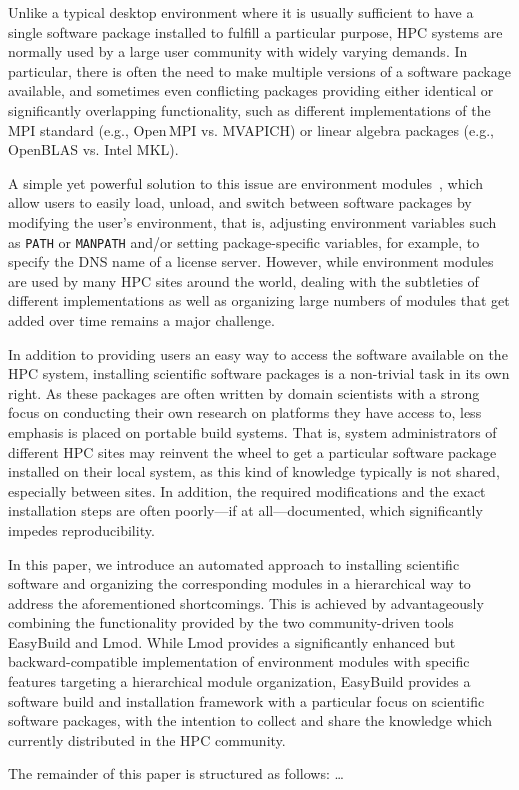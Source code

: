 Unlike a typical desktop environment where it is usually sufficient to have a
single software package installed to fulfill a particular purpose, HPC
systems are normally used by a large user community with widely varying
demands. In particular, there is often the need to make multiple versions of
a software package available, and sometimes even conflicting packages
providing either identical or significantly overlapping functionality, such
as different implementations of the MPI standard (e.g., Open\,MPI vs.
MVAPICH) or linear algebra packages (e.g., OpenBLAS vs. Intel MKL).

A simple yet powerful solution to this issue are environment
modules~\cite{environment_modules_paper}, which allow users to easily load,
unload, and switch between software packages by  modifying the user's
environment, that is, adjusting environment variables such as \texttt{PATH}
or \texttt{MANPATH} and/or setting package-specific variables, for example,
to specify the DNS name of a license server. However, while environment
modules are used by many HPC sites around the world, dealing with the
subtleties of different implementations as well as organizing large numbers
of modules that get added over time remains a major challenge.

In addition to providing users an easy way to access the software available
on the HPC system, installing scientific software packages is a non-trivial
task in its own right. As these packages are often written by domain
scientists with a strong focus on conducting their own research on platforms
they have access to, less emphasis is placed on portable build systems. That
is, system administrators of different HPC sites may reinvent the wheel to
get a particular software package installed on their local system, as this
kind of knowledge typically is not shared, especially between sites. In
addition, the required modifications and the exact installation steps are
often poorly---if at all---documented, which significantly impedes
reproducibility.

In this paper, we introduce an automated approach to installing scientific
software and organizing the corresponding modules in a hierarchical way to
address the aforementioned shortcomings. This is achieved by advantageously
combining the functionality provided by the two community-driven tools
EasyBuild and Lmod. While Lmod provides a significantly enhanced but
backward-compatible implementation of environment modules with specific
features targeting a hierarchical module organization, EasyBuild provides a
software build and installation framework with a particular focus on
scientific software packages, with the intention to collect and share the
knowledge which currently distributed in the HPC community.

The remainder of this paper is structured as follows: \ldots

